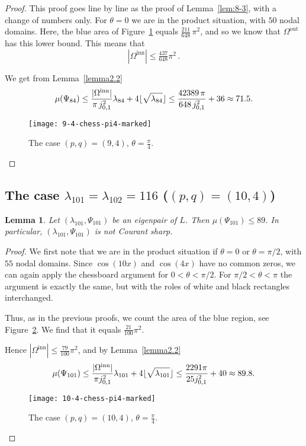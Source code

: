 \documentclass[a4paper,reqno,11pt]{amsart}
\newtheorem{lemma}[thm]{Lemma}
\theoremstyle{remark}
\theoremstyle{definition}
\numberwithin{equation}{section}
\begin{document}
\begin{proof}
This proof  goes line by line as the proof of Lemma~\ref{lem:8-3}, with a 
change of numbers only. For $\theta=0$ we are in the product situation, with 
$50$ nodal domains. Here, the blue area of Figure~\ref{fig:9-4-chess-pi4-marked}
equals $\tfrac{211}{648}\, \pi^2$, and so we know that $\Omega^{\text{out}}$ has this
lower bound. This means that 
\[
|\Omega^{\text{inn}}|\leq \tfrac{437}{648}\pi^2\,.
\]

We get from Lemma~\ref{lemma2.2}
\[
\mu(\Psi_{84})\leq 
\frac{|\Omega^{\text{inn}}|}{\pi\, j_{0,1}^2}\lambda_{84}+4\lfloor\sqrt{\lambda_{84}}\rfloor
\leq \frac{42389\, \pi}{648\, j_{0,1}^2}+36\approx 71.5.\qedhere
\]

\begin{figure}[htbp]
\centering
\texttt{[image: 9-4-chess-pi4-marked]}
\caption{The case $(p,q)= (9,4)$, $\theta = \frac \pi 4$.}
\label{fig:9-4-chess-pi4-marked}
\end{figure}
\end{proof}

\subsection{The case $\lambda_{101}=\lambda_{102}=116$ ($(p,q)=(10,4)$)}

\begin{lemma}
\label{lem:10-4}
Let $(\lambda_{101},\Psi_{101})$ be an eigenpair of $L$. Then 
$\mu(\Psi_{101})\leq 89$. In particular, $(\lambda_{101},\Psi_{101})$ is not
Courant sharp.
\end{lemma}

\begin{proof}
We first note that we are in the product situation if $\theta=0$ or $\theta=\pi/2$,
with $55$ nodal domains.
Since $\cos(10x)$ and $\cos(4x)$ have no common zeros, we can again apply the 
chessboard argument for $0<\theta<\pi/2$.  For $\pi/2<\theta<\pi$
the argument is exactly the same, but with the roles of white and black 
rectangles interchanged.

Thus, as in the previous proofs, we count the area of the blue region, see
Figure~\ref{fig:10-4-chess-pi4-marked}. We find that it equals 
$\tfrac{21}{100}\pi^2$. 

Hence $|\Omega^{\text{inn}}|\leq \tfrac{79}{100}\pi^2$, and by 
Lemma~\ref{lemma2.2}
\[
\mu(\Psi_{101})\leq 
\frac{|\Omega^{\text{inn}}|}{\pi j_{0,1}^2}\lambda_{101}
+4\lfloor\sqrt{\lambda_{101}}\rfloor
\leq \frac{2291\pi}{25j_{0,1}^2}+40\approx 89.8.\qedhere
\]
\begin{figure}[htbp]
\centering
\texttt{[image: 10-4-chess-pi4-marked]}
\caption{The case $(p,q)= (10,4)$, $\theta = \frac \pi 4$.}
\label{fig:10-4-chess-pi4-marked}
\end{figure}
\end{proof}
\end{document}
